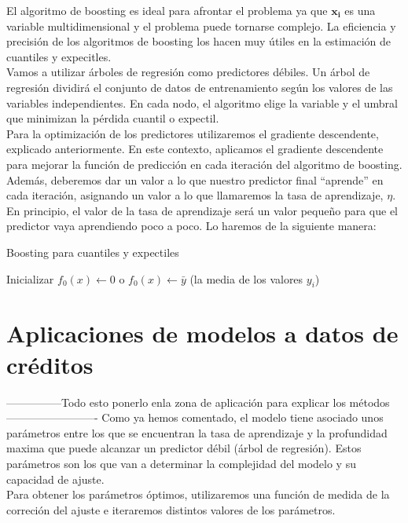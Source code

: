 \documentclass[11pt]{book}
\theoremstyle{plain} %
\theoremstyle{definition} %
\begin{document}
El algoritmo de boosting es ideal para afrontar el problema ya que $\mathbf{x_i}$ es una 
variable multidimensional y el problema puede tornarse complejo. La eficiencia y precisión 
de los algoritmos de boosting los hacen muy útiles en la estimación de cuantiles y 
expecitles.\\

Vamos a utilizar árboles de regresión como predictores débiles. Un árbol de regresión 
dividirá el conjunto de datos de entrenamiento según los valores de las variables
independientes. En cada nodo, el algoritmo elige la variable y el umbral que minimizan 
la pérdida cuantil o expectil.\\

Para la optimización de los predictores utilizaremos el gradiente descendente, explicado 
anteriormente. En este contexto, aplicamos el gradiente descendente para mejorar la 
función de predicción en cada iteración del algoritmo de boosting.\\

Además, deberemos dar un valor a lo que nuestro predictor final ``aprende'' en cada 
iteración, asignando un valor a lo que llamaremos la tasa de aprendizaje, $\eta$. En 
principio, el valor de la tasa de aprendizaje será un valor pequeño para que el predictor 
vaya aprendiendo poco a poco. Lo haremos de la siguiente manera:


\begin{algorithm}[H]
   \caption{Boosting para cuantiles y expectiles}
   
   Inicializar $f_0(x) \gets 0$ o $f_0(x) \gets \bar{y}$ (la media de los valores $y_i$)\;
   
   \end{algorithm}
   


\chapter{Aplicaciones de modelos a datos de créditos}
---------------Todo esto ponerlo enla zona de aplicación para explicar los métodos-------------------------
Como ya hemos comentado, el modelo tiene asociado unos parámetros entre los que se encuentran la tasa de aprendizaje y la profundidad
maxima que puede alcanzar un predictor débil (árbol de regresión). Estos parámetros son los que van a determinar la complejidad del modelo y su capacidad de ajuste.\\
Para obtener los parámetros óptimos, utilizaremos una función de medida de la correción del ajuste e iteraremos distintos valores de los parámetros.\\
\end{document}
